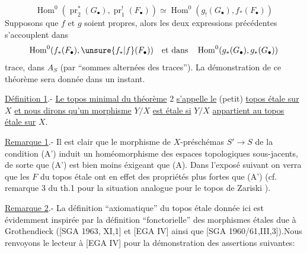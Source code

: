 \[
\operatorname{Hom}^0(\operatorname{pr}_2^*(G_\bullet),\operatorname{pr}_1^!(F_\bullet))\simeq\operatorname{Hom}^0(g_!(G_\bullet),f_*(F_\bullet))
\]
Supposons que $f$ et $g$ soient propres, alors les
deux expressions précédentes s'accouplent dans
\[
\operatorname{Hom}^0(f_*(F_\bullet),\unsure{f_*|f}(F_\bullet))\quad\text{et dans}\quad\operatorname{Hom}^0(g_*(G_\bullet),g_*(G_\bullet))
\]
trace, dans  $A_S$
(par ``sommes alternées
des traces'').
La démonstration de ce théorème sera donnée dans un instant.

\uline{Définition 1}.- \uline{Le topos minimal du théorème} 2 \uline{s'appelle le}
(petit) \uline{topos étale sur} $X$ \uline{et nous dirons qu'un morphisme} $Y/X$
\uline{est étale si} $Y/X$ \uline{appartient au topos étale sur} $X$.

\uline{Remarque 1}.- Il est clair que le morphisme de $X$-préschémas
$S'\longrightarrow S$ de la condition (A') induit un homéomorphisme des espaces
topologiques sous-jacents, de sorte que (A') est bien moins
éxigeant que (A). Dans l'exposé suivant on verra que les $F$ du
topos étale ont en effet des propriétés  plus fortes que (A')
(cf. remarque 3 du th.1 pour la situation analogue pour le topos
de Zariski ).

\uline{Remarque 2}.- La définition ``axiomatique'' du topos étale donnée
ici est évidemment inspirée par la définition ``fonctorielle''
des morphismes étales due à Grothendieck ([SGA 1963, XI,1] et
[EGA IV\qquad] ainsi que [SGA 1960/61,III,3]).Nous renvoyons
le lecteur à [EGA IV\qquad] pour la démonstration des assertions
suivantes:

